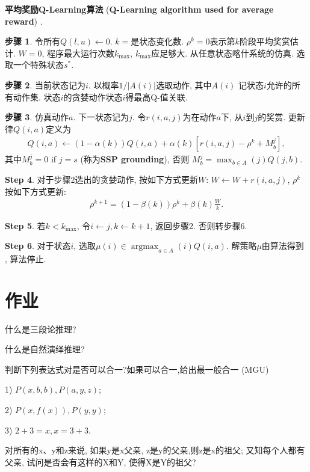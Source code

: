 \textbf{平均奖励Q-Learning算法} (\textbf{Q-Learning algorithm used for average reward}) \cite{gosavi2004reinforcement}.

\textbf{步骤 1}. 令所有$Q(l,u) \leftarrow 0$. $k=$是状态变化数. $\rho^k=0$表示第$k$阶段平均奖赏估计. $W=0$, 程序最大运行次数$k_{\max}$, $k_{\max}$应足够大. 从任意状态喀什系统的仿真. 选取一个特殊状态$s^{*}$.

\textbf{步骤 2}. 当前状态记为$i$. 以概率$1/|A (i)|$选取动作, 其中$A(i)$ 记状态$i$允许的所有动作集. 状态$i$的贪婪动作状态$i$得最高Q-值关联.

\textbf{步骤 3}. 仿真动作$a$. 下一状态记为$j$. 令$r(i, a, j)$为在动作$a$下, 从$i$到$j$的奖赏. 更新律$Q(i,a)$定义为
\begin{eqnarray}
  Q(i,a)\leftarrow (1-\alpha(k))Q(i,a)+\alpha(k)[r(i,a,j)-\rho^k+M_b^j],
\end{eqnarray}
其中$M_b^j= 0$ if $j = s$ (称为\textbf{SSP grounding}), 否则 $M^j_b= \max_{b\in A}(j)Q(j,b)$.

\textbf{Step 4}. 对于步骤2选出的贪婪动作, 按如下方式更新$W$: $W \leftarrow W + r(i, a, j)$, $\rho^k$按如下方式更新:
\begin{eqnarray}
  \rho^{k+1}= (1 - \beta(k))\rho^k+ \beta(k)\frac{W}{k}.
\end{eqnarray}

\textbf{Step 5}. 若$k < k_{\max}$, 令$i \leftarrow j, k \leftarrow k + 1$, 返回步骤2. 否则转步骤6.

\textbf{Step 6}. 对于状态$i$, 选取$\mu(i)\in  \mathop{\arg\max}_{a\in A }(i)Q(i, a)$. 解策略$\mu$由算法得到 , 算法停止.

\section{作业}

\begin{think}
    什么是三段论推理?
\end{think}

\begin{think}
    什么是自然演绎推理?
\end{think}

\begin{think}
判断下列表达式对是否可以合一?如果可以合一,给出最一般合一 (MGU)

1) $P(x,b,b), P(a, y, z)$;

2) $P(x,f(x)),P(y,y)$;

3) $2+3=x,x=3+3$.
\end{think}

\begin{think}
    对所有的x、y和z来说, 如果y是x父亲, z是y的父亲,则z是x的祖父; 又知每个人都有父亲, 试问是否会有这样的X和Y, 使得X是Y的祖父?
\end{think}
